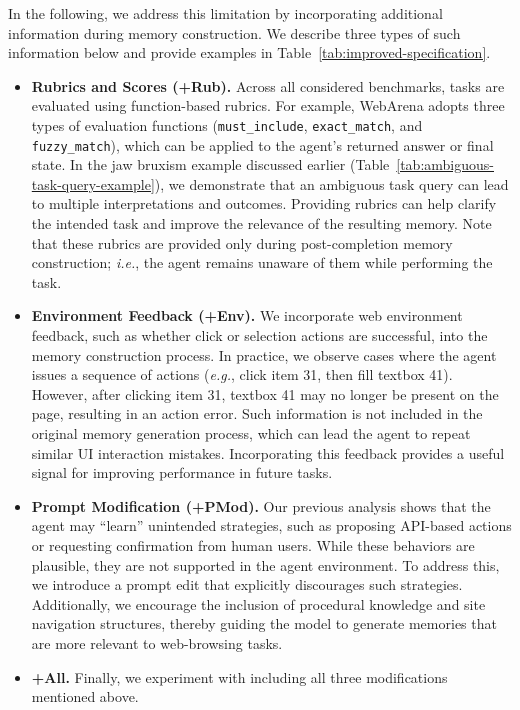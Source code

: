 \documentclass{article}
\begin{document}
In the following, we address this limitation by incorporating additional information during memory construction. We describe three types of such information below and provide examples in Table~\ref{tab:improved-specification}.

\begin{itemize}[leftmargin=2em, topsep=0pt, parsep=0pt]

\item \textbf{Rubrics and Scores (+Rub).} Across all considered benchmarks, tasks are evaluated using function-based rubrics. For example, WebArena adopts three types of evaluation functions (\texttt{must\_include}, \texttt{exact\_match}, and \texttt{fuzzy\_match}), which can be applied to the agent’s returned answer or final state. In the jaw bruxism example discussed earlier (Table~\ref{tab:ambiguous-task-query-example}), we demonstrate that an ambiguous task query can lead to multiple interpretations and outcomes. Providing rubrics can help clarify the intended task and improve the relevance of the resulting memory. Note that these rubrics are provided only during post-completion memory construction; \textit{i.e.}, the agent remains unaware of them while performing the task.

\item \textbf{Environment Feedback (+Env).} We incorporate web environment feedback, such as whether click or selection actions are successful, into the memory construction process. In practice, we observe cases where the agent issues a sequence of actions (\textit{e.g.}, click item 31, then fill textbox 41). However, after clicking item 31, textbox 41 may no longer be present on the page, resulting in an action error. Such information is not included in the original memory generation process, which can lead the agent to repeat similar UI interaction mistakes. Incorporating this feedback provides a useful signal for improving performance in future tasks.

\item \textbf{Prompt Modification (+PMod).}
Our previous analysis shows that the agent may ``learn'' unintended strategies, such as proposing API-based actions or requesting confirmation from human users. While these behaviors are plausible, they are not supported in the agent environment. To address this, we introduce a prompt edit that explicitly discourages such strategies. Additionally, we encourage the inclusion of procedural knowledge and site navigation structures, thereby guiding the model to generate memories that are more relevant to web-browsing tasks.

\item \textbf{+All.} Finally, we experiment with including all three modifications mentioned above. 

\end{itemize}
\end{document}
